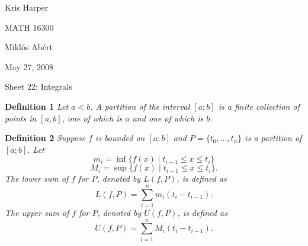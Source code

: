 \documentclass{article}
\begin{document}
\newpage

\begin{flushright}
Kris Harper

MATH 16300

Mikl\'{o}s Ab\'{e}rt

May 27, 2008
\end{flushright}

\begin{flushleft}

\Large

Sheet 22: Integrals\newline

\normalsize

\textbf{Definition 1}
\textsl{Let $a<b$. A partition of the interval $[a;b]$ is a finite collection of points in $[a,b]$, one of which is $a$ and one of which is $b$.}\newline

\textbf{Definition 2}
\textsl{Suppose $f$ is bounded on $[a;b]$ and $P=\{t_0, \dots , t_n\}$ is a partition of $[a;b]$. Let
\[
m_i = \inf \{f(x) \mid t_{i-1} \leq x \leq t_i\}
\]
\[
M_i = \sup \{f(x) \mid t_{i-1} \leq x \leq t_i\}.
\]
The lower sum of $f$ for $P$, denoted by $L(f,P)$, is defined as
\[
L(f,P) = \sum_{i=1}^n m_i (t_i - t_{i-1}).
\]
The upper sum of $f$ for $P$, denoted by $U(f,P)$, is defined as
\[
U(f,P) = \sum_{i=1}^n M_i (t_i - t_{i-1}).
\]}\newline


\end{flushleft}
\end{document}
